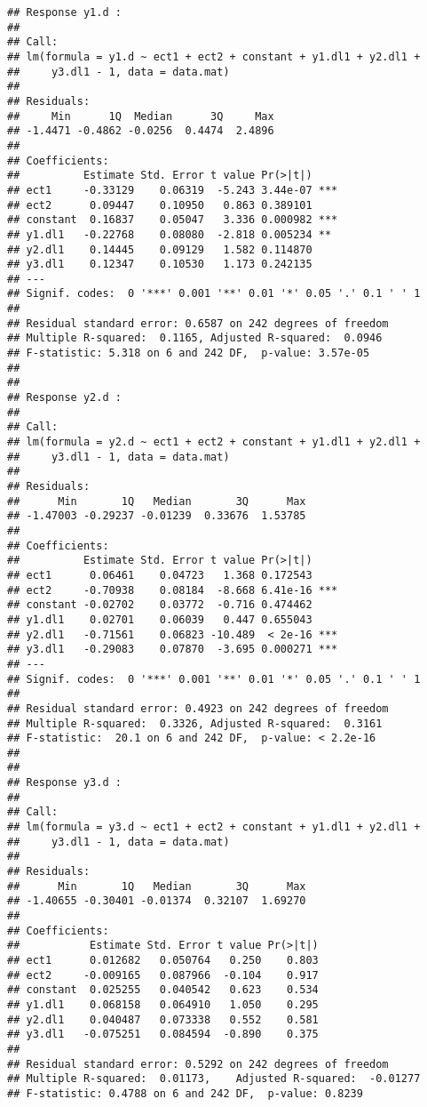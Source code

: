 \documentclass[]{book}
\theoremstyle{definition}
\theoremstyle{definition}
\theoremstyle{definition}
\theoremstyle{remark}
\begin{document}
\begin{verbatim}
## Response y1.d :
## 
## Call:
## lm(formula = y1.d ~ ect1 + ect2 + constant + y1.dl1 + y2.dl1 + 
##     y3.dl1 - 1, data = data.mat)
## 
## Residuals:
##     Min      1Q  Median      3Q     Max 
## -1.4471 -0.4862 -0.0256  0.4474  2.4896 
## 
## Coefficients:
##          Estimate Std. Error t value Pr(>|t|)    
## ect1     -0.33129    0.06319  -5.243 3.44e-07 ***
## ect2      0.09447    0.10950   0.863 0.389101    
## constant  0.16837    0.05047   3.336 0.000982 ***
## y1.dl1   -0.22768    0.08080  -2.818 0.005234 ** 
## y2.dl1    0.14445    0.09129   1.582 0.114870    
## y3.dl1    0.12347    0.10530   1.173 0.242135    
## ---
## Signif. codes:  0 '***' 0.001 '**' 0.01 '*' 0.05 '.' 0.1 ' ' 1
## 
## Residual standard error: 0.6587 on 242 degrees of freedom
## Multiple R-squared:  0.1165, Adjusted R-squared:  0.0946 
## F-statistic: 5.318 on 6 and 242 DF,  p-value: 3.57e-05
## 
## 
## Response y2.d :
## 
## Call:
## lm(formula = y2.d ~ ect1 + ect2 + constant + y1.dl1 + y2.dl1 + 
##     y3.dl1 - 1, data = data.mat)
## 
## Residuals:
##      Min       1Q   Median       3Q      Max 
## -1.47003 -0.29237 -0.01239  0.33676  1.53785 
## 
## Coefficients:
##          Estimate Std. Error t value Pr(>|t|)    
## ect1      0.06461    0.04723   1.368 0.172543    
## ect2     -0.70938    0.08184  -8.668 6.41e-16 ***
## constant -0.02702    0.03772  -0.716 0.474462    
## y1.dl1    0.02701    0.06039   0.447 0.655043    
## y2.dl1   -0.71561    0.06823 -10.489  < 2e-16 ***
## y3.dl1   -0.29083    0.07870  -3.695 0.000271 ***
## ---
## Signif. codes:  0 '***' 0.001 '**' 0.01 '*' 0.05 '.' 0.1 ' ' 1
## 
## Residual standard error: 0.4923 on 242 degrees of freedom
## Multiple R-squared:  0.3326, Adjusted R-squared:  0.3161 
## F-statistic:  20.1 on 6 and 242 DF,  p-value: < 2.2e-16
## 
## 
## Response y3.d :
## 
## Call:
## lm(formula = y3.d ~ ect1 + ect2 + constant + y1.dl1 + y2.dl1 + 
##     y3.dl1 - 1, data = data.mat)
## 
## Residuals:
##      Min       1Q   Median       3Q      Max 
## -1.40655 -0.30401 -0.01374  0.32107  1.69270 
## 
## Coefficients:
##           Estimate Std. Error t value Pr(>|t|)
## ect1      0.012682   0.050764   0.250    0.803
## ect2     -0.009165   0.087966  -0.104    0.917
## constant  0.025255   0.040542   0.623    0.534
## y1.dl1    0.068158   0.064910   1.050    0.295
## y2.dl1    0.040487   0.073338   0.552    0.581
## y3.dl1   -0.075251   0.084594  -0.890    0.375
## 
## Residual standard error: 0.5292 on 242 degrees of freedom
## Multiple R-squared:  0.01173,    Adjusted R-squared:  -0.01277 
## F-statistic: 0.4788 on 6 and 242 DF,  p-value: 0.8239
\end{verbatim}
\end{document}
